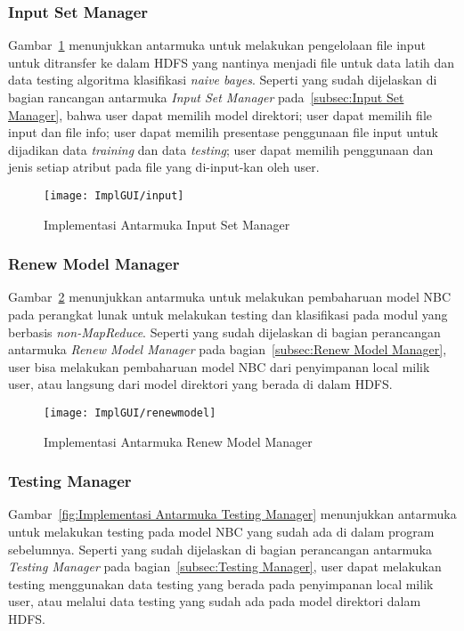 \subsubsection{Input Set Manager}
Gambar~\ref{fig:Implementasi Antarmuka Input Set Manager} menunjukkan antarmuka untuk melakukan pengelolaan file input untuk ditransfer ke dalam HDFS yang nantinya menjadi file untuk data latih dan data testing algoritma klasifikasi \textit{naive bayes}. Seperti yang sudah dijelaskan di bagian rancangan antarmuka \textit{Input Set Manager} pada~\ref{subsec:Input Set Manager}, bahwa user dapat memilih model direktori; user dapat memilih file input dan file info; user dapat memilih presentase penggunaan file input untuk dijadikan data \textit{training} dan data \textit{testing}; user dapat memilih penggunaan dan jenis setiap atribut pada file yang di-input-kan oleh user.

\begin{figure}[H]
	\centering
	\texttt{[image: ImplGUI/input]}
	\caption[Implementasi Antarmuka Input Set Manager]{Implementasi Antarmuka Input Set Manager}
	\label{fig:Implementasi Antarmuka Input Set Manager}
\end{figure}


\subsubsection{Renew Model Manager}
Gambar~\ref{fig:Implementasi Antarmuka Renew Model Manager} menunjukkan antarmuka untuk melakukan pembaharuan model NBC pada perangkat lunak untuk melakukan testing dan klasifikasi pada modul yang berbasis \textit{non-MapReduce}. Seperti yang sudah dijelaskan di bagian perancangan antarmuka \textit{Renew Model Manager} pada bagian~\ref{subsec:Renew Model Manager}, user bisa melakukan pembaharuan model NBC dari penyimpanan local milik user, atau langsung dari model direktori yang berada di dalam HDFS.

\begin{figure}[H]
	\centering
	\texttt{[image: ImplGUI/renewmodel]}
	\caption[Implementasi Antarmuka Renew Model Manager]{Implementasi Antarmuka Renew Model Manager}
	\label{fig:Implementasi Antarmuka Renew Model Manager}
\end{figure}


\subsubsection{Testing Manager}
Gambar~\ref{fig:Implementasi Antarmuka Testing Manager} menunjukkan antarmuka untuk melakukan testing pada model NBC yang sudah ada di dalam program sebelumnya. Seperti yang sudah dijelaskan di bagian perancangan antarmuka \textit{Testing Manager} pada bagian~\ref{subsec:Testing Manager}, user dapat melakukan testing menggunakan data testing yang berada pada penyimpanan local milik user, atau melalui data testing yang sudah ada pada model direktori dalam HDFS.

